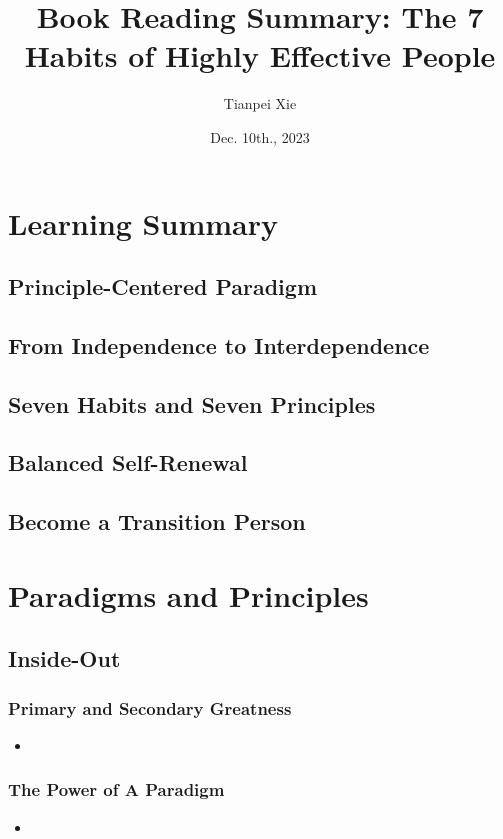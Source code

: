 \documentclass[11pt]{article}
\begin{document}
\title{Book Reading Summary: The 7 Habits of Highly Effective People}
\author{ Tianpei Xie}
\date{Dec. 10th., 2023}
\maketitle
\tableofcontents
\newpage
\section{Learning Summary}
\subsection{Principle-Centered Paradigm}
\subsection{From Independence to Interdependence}
\subsection{Seven Habits and Seven Principles}
\subsection{Balanced Self-Renewal}
\subsection{Become a Transition Person}

\section{Paradigms and Principles}
\subsection{Inside-Out}
\subsubsection{Primary and Secondary Greatness}
\begin{itemize}
\item 
\end{itemize}
\subsubsection{The Power of A Paradigm}
\begin{itemize}
\item 
\end{itemize}
\end{document}
